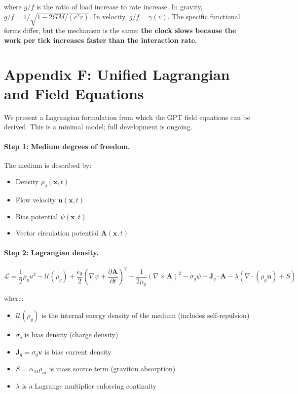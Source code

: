 \documentclass[12pt, a4paper]{article}
\begin{document}
where \( g/f \) is the ratio of load increase to rate increase. In gravity, \( g/f = 1/\sqrt{1 - 2GM/(c^2 r)} \). In velocity, \( g/f = \gamma(v) \). The specific functional forms differ, but the mechanism is the same: \textbf{the clock slows because the work per tick increases faster than the interaction rate.}

\section{Appendix F: Unified Lagrangian and Field Equations}
\label{app:I}

We present a Lagrangian formulation from which the GPT field equations can be derived. This is a minimal model; full development is ongoing.

\paragraph{Step 1: Medium degrees of freedom.}

The medium is described by:
\begin{itemize}
    \item Density \( \rho_g(\mathbf{x}, t) \)
    \item Flow velocity \( \mathbf{u}(\mathbf{x}, t) \)
    \item Bias potential \( \psi(\mathbf{x}, t) \)
    \item Vector circulation potential \( \mathbf{A}(\mathbf{x}, t) \)
\end{itemize}

\paragraph{Step 2: Lagrangian density.}

\[
\mathcal{L} = \frac{1}{2} \rho_g u^2 - \mathcal{U}(\rho_g) + \frac{\epsilon_0}{2} \left(\nabla \psi + \frac{\partial \mathbf{A}}{\partial t}\right)^2 - \frac{1}{2\mu_0} (\nabla \times \mathbf{A})^2 - \sigma_q \psi + \mathbf{J}_q \cdot \mathbf{A} - \lambda (\nabla \cdot (\rho_g \mathbf{u}) + S)
\]

where:
\begin{itemize}
    \item \( \mathcal{U}(\rho_g) \) is the internal energy density of the medium (includes self-repulsion)
    \item \( \sigma_q \) is bias density (charge density)
    \item \( \mathbf{J}_q = \sigma_q \mathbf{v} \) is bias current density
    \item \( S = \alpha_M \rho_m \) is mass source term (graviton absorption)
    \item \( \lambda \) is a Lagrange multiplier enforcing continuity
\end{itemize}
\end{document}
